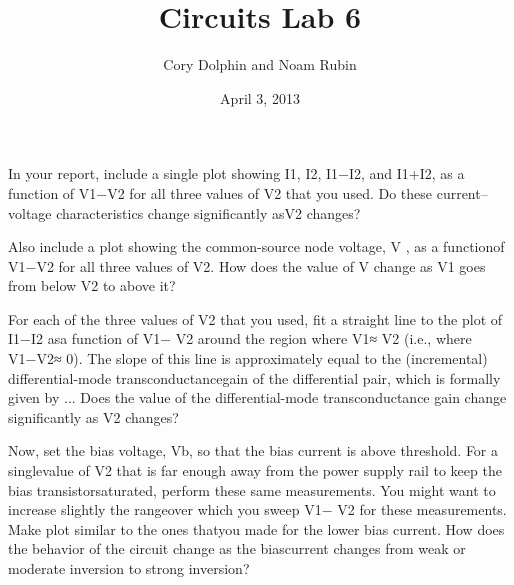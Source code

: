 \documentclass{article}
\title{Circuits Lab 6}
\author{Cory Dolphin and Noam Rubin}
\date{April 3, 2013}
\begin{document}
\maketitle

In your report, include a single plot showing I1, I2, I1−I2, and I1+I2, as a function of V1−V2 for all three values of V2 that you used. Do these current–voltage characteristics change signiﬁcantly asV2 changes? 

Also include a plot showing the common-source node voltage, V , as a functionof V1−V2 for all three values of V2. How does the value of V change as V1 goes from below V2 to above it?

For each of the three values of V2 that you used, ﬁt a straight line to the plot of I1−I2 asa function of V1− V2 around the region where V1≈ V2 (i.e., where V1−V2≈ 0). The slope of this line is approximately equal to the (incremental) differential-mode transconductancegain of the differential pair, which is formally given by ... Does the value of the diﬀerential-mode transconductance gain change signiﬁcantly as V2 changes?


Now, set the bias voltage, Vb, so that the bias current is above threshold. For a singlevalue of V2 that is far enough away from the power supply rail to keep the bias transistorsaturated, perform these same measurements. You might want to increase slightly the rangeover which you sweep V1− V2 for these measurements. Make plot similar to the ones thatyou made for the lower bias current. How does the behavior of the circuit change as the biascurrent changes from weak or moderate inversion to strong inversion?


\end{document}
